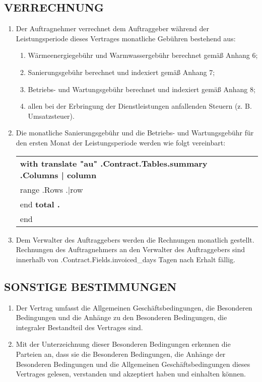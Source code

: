 \subsection{VERRECHNUNG}
\begin{enumerate}
	\item Der Auftragnehmer verrechnet dem Auftraggeber während der Leistungsperiode dieses Vertrages monatliche Gebühren bestehend aus:
	\begin{enumerate}
		\item Wärmeenergiegebühr und Warmwassergebühr berechnet gemäß Anhang 6;
		\item Sanierungsgebühr berechnet und indexiert gemäß Anhang 7;
		\item Betriebs- und Wartungsgebühr berechnet und indexiert gemäß Anhang 8;
		\item allen bei der Erbringung der Dienstleistungen anfallenden Steuern (z. B. Umsatzsteuer).
	\end{enumerate}
	\item Die monatliche Sanierungsgebühr und die Betriebs- und Wartungsgebühr für den ersten Monat der Leistungsperiode werden wie folgt vereinbart:


\begin{center}
	\begin{tabu}{|X|X|X|X|}\tabucline{}\rowfont[c]\bfseries
	{{with translate "au" .Contract.Tables.summary}} %
	{{.Columns | column}} \\\tabucline{}
	{{range .Rows}} %
	{{.|row}} \\\tabucline{}
	{{end}}
	\bfseries {{total .}} \\\tabucline{} %
	{{end}}
	\end{tabu}
\end{center}

\item Dem Verwalter des Auftraggebers werden die Rechnungen monatlich gestellt. Rechnungen des Auftragnehmers an den Verwalter des Auftraggebers sind innerhalb von \iffalse input fields.invoiced_days value="{{.Contract.Fields.invoiced_days}}" type="number" \fi {{.Contract.Fields.invoiced_days}} Tagen nach Erhalt fällig.
\end{enumerate}

\subsection{SONSTIGE BESTIMMUNGEN}
\begin{enumerate}
\item Der Vertrag umfasst die Allgemeinen Geschäftsbedingungen, die Besonderen Bedingungen und die Anhänge zu den Besonderen Bedingungen, die integraler Bestandteil des Vertrages sind.
\item Mit der Unterzeichnung dieser Besonderen Bedingungen erkennen die Parteien an, dass sie die Besonderen Bedingungen, die Anhänge der Besonderen Bedingungen und die
  Allgemeinen Geschäftsbedingungen dieses Vertrages gelesen, verstanden und akzeptiert haben und einhalten können.
\end{enumerate}


